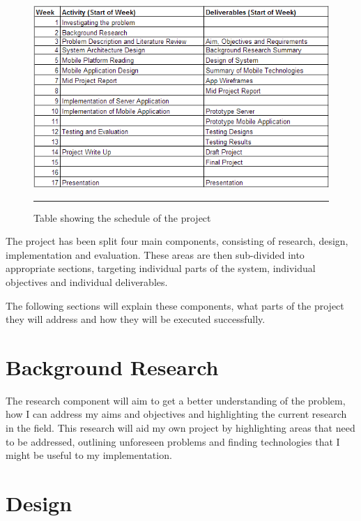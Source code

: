 \begin{figure}[htbp]
	\centering
\includegraphics[width=\textwidth,height=\textheight,keepaspectratio]{Figures/projectplan.png}
		\rule{35em}{0.5pt}
	\caption[Table showing the schedule of the project]{Table showing the schedule of the project}
	\label{fig:projectplan}
\end{figure}

The project has been split four main components, consisting of research, design, implementation and evaluation. These areas are then sub-divided into appropriate sections, targeting individual parts of the system, individual objectives and individual deliverables.

The following sections will explain these components, what parts of the project they will address and how they will be executed successfully.


\section{Background Research}

The research component will aim to get a better understanding of the problem, how I can address my aims and objectives and highlighting the current research in the field. This research will aid my own project by highlighting areas that need to be addressed, outlining unforeseen problems and finding technologies that I might be useful to my implementation.


\section{Design}

